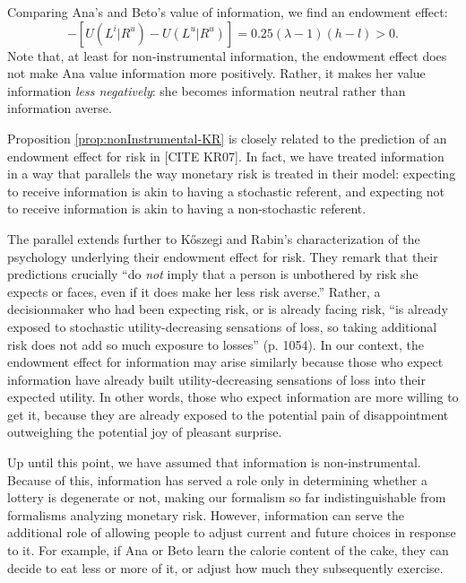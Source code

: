 \documentclass[12pt]{article}
\begin{document}
Comparing Ana's and Beto's value of information, we find an endowment effect:
\begin{equation*}
  [U(L^i|R^i)-U(L^u|R^i)]-[U(L^i|R^u)-U(L^u|R^u)]=0.25(\lambda-1)(h-l)>0.
\end{equation*}
Note that, at least for non-instrumental information, the endowment effect does not make Ana value information more positively. Rather, it makes her value information \emph{less negatively}: she becomes information neutral rather than information averse.

Proposition \ref{prop:nonInstrumental-KR} is closely related to the prediction of an endowment effect for risk in [CITE KR07]. In fact, we have treated information in a way that parallels the way monetary risk is treated in their model: expecting to receive information is akin to having a stochastic referent, and expecting not to receive information is akin to having a non-stochastic referent.

The parallel extends further to Kőszegi and Rabin’s characterization of the psychology underlying their endowment effect for risk. They remark that their predictions crucially \enquote{do \emph{not} imply that a person is unbothered by risk she expects or faces, even if it does make her less risk averse.} Rather, a decisionmaker who had been expecting risk, or is already facing risk, \enquote{is already exposed to stochastic utility-decreasing sensations of loss, so taking additional risk does not add so much exposure to losses} (p. 1054). In our context, the endowment effect for information may arise similarly because those who expect information have already built utility-decreasing sensations of loss into their expected utility. In other words, those who expect information are more willing to get it, because they are already exposed to the potential pain of disappointment outweighing the potential joy of pleasant surprise.

\FloatBarrier

Up until this point, we have assumed that information is non-instrumental. Because of this, information has served a role only in determining whether a lottery is degenerate or not, making our formalism so far indistinguishable from formalisms analyzing monetary risk. However, information can serve the additional role of allowing people to adjust current and future choices in response to it. For example, if Ana or Beto learn the calorie content of the cake, they can decide to eat less or more of  it, or adjust how much they subsequently exercise.
\end{document}
